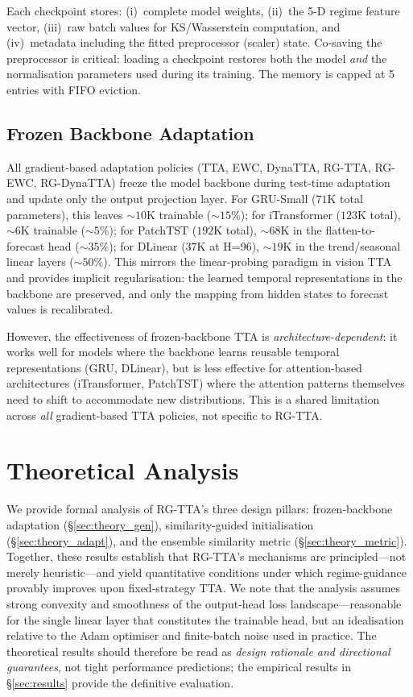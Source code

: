 \documentclass[journal]{IEEEtran}
\begin{document}
Each checkpoint stores: (i)~complete model weights, (ii)~the 5-D regime feature vector, (iii)~raw batch values for KS/Wasserstein computation, and (iv)~metadata including the fitted preprocessor (scaler) state. Co-saving the preprocessor is critical: loading a checkpoint restores both the model \emph{and} the normalisation parameters used during its training. The memory is capped at 5 entries with FIFO eviction.

\subsection{Frozen Backbone Adaptation}
\label{sec:frozen}

All gradient-based adaptation policies (TTA, EWC, DynaTTA, RG-TTA, RG-EWC, RG-DynaTTA) freeze the model backbone during test-time adaptation and update only the output projection layer. For GRU-Small ($71$K total parameters), this leaves $\sim10$K trainable ($\sim15\%$); for iTransformer ($123$K total), $\sim6$K trainable ($\sim5\%$); for PatchTST ($192$K total), $\sim68$K in the flatten-to-forecast head ($\sim35\%$); for DLinear ($37$K at H=96), $\sim19$K in the trend/seasonal linear layers ($\sim50\%$). This mirrors the linear-probing paradigm in vision TTA and provides implicit regularisation: the learned temporal representations in the backbone are preserved, and only the mapping from hidden states to forecast values is recalibrated.

However, the effectiveness of frozen-backbone TTA is \emph{architecture-dependent}: it works well for models where the backbone learns reusable temporal representations (GRU, DLinear), but is less effective for attention-based architectures (iTransformer, PatchTST) where the attention patterns themselves need to shift to accommodate new distributions. This is a shared limitation across \emph{all} gradient-based TTA policies, not specific to RG-TTA.


\section{Theoretical Analysis}
\label{sec:theory}

We provide formal analysis of RG-TTA's three design pillars: frozen-backbone adaptation (\S\ref{sec:theory_gen}), similarity-guided initialisation (\S\ref{sec:theory_adapt}), and the ensemble similarity metric (\S\ref{sec:theory_metric}). Together, these results establish that RG-TTA's mechanisms are principled---not merely heuristic---and yield quantitative conditions under which regime-guidance provably improves upon fixed-strategy TTA. We note that the analysis assumes strong convexity and smoothness of the output-head loss landscape---reasonable for the single linear layer that constitutes the trainable head, but an idealisation relative to the Adam optimiser and finite-batch noise used in practice. The theoretical results should therefore be read as \emph{design rationale and directional guarantees}, not tight performance predictions; the empirical results in \S\ref{sec:results} provide the definitive evaluation.
\end{document}

